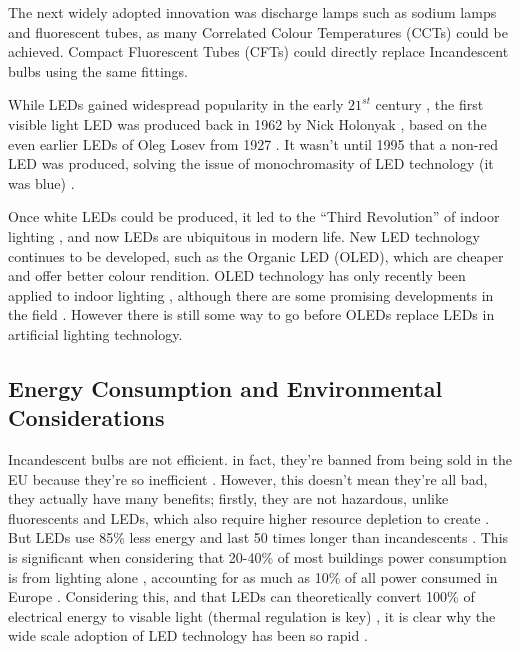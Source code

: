 The next widely adopted innovation was discharge lamps such as sodium lamps and fluorescent tubes, as many Correlated Colour Temperatures (CCTs) could be achieved. Compact Fluorescent Tubes (CFTs) could directly replace Incandescent bulbs using the same fittings.

While LEDs gained widespread popularity in the early $21^{st}$ century \citep{matsumotoMeasuringHouseholdAbility2020}, the first visible light LED was produced back in 1962 by Nick Holonyak \citep{holonyakCOHERENTVISIBLELIGHT1962}, based on the even earlier LEDs of Oleg Losev from 1927 \citep{zheludevLifeTimesLED2007}. It wasn't until 1995 that a non-red LED was produced, solving the issue of monochromasity of LED technology (it was blue) \citep{nakamuraInGaNAlGaNBlue1995}.

Once white LEDs could be produced, it led to the ``Third Revolution'' of indoor lighting \citep{montoyaIndoorLightingTechniques2017a}, and now LEDs are ubiquitous in modern life. New LED technology continues to be developed, such as the Organic LED (OLED), which are cheaper and offer better colour rendition. OLED technology has only recently been applied to indoor lighting \citep{phelanOLEDLightingHits2018}, although there are some promising developments in the field \citep{benderSolidStateLightingConcise2015}. However there is still some way to go before OLEDs replace LEDs in artificial lighting technology.

\subsection{Energy Consumption and Environmental Considerations}
\label{sec:Energy}

Incandescent bulbs are not efficient. in fact, they're banned from being sold in the EU because they're so inefficient \citep{euDirective2012272012}. However, this doesn't mean they're all bad, they actually have many benefits; firstly, they are not hazardous, unlike fluorescents and LEDs, which also require higher resource depletion to create \citep{limPotentialEnvironmentalImpacts2013}. But LEDs use 85\% less energy and last 50 times longer than incandescents \citep{mottierLEDLightingApplications2010}. This is significant when considering that 20-40\% of most buildings power consumption is from lighting alone \citep{perez-lombardReviewBuildingsEnergy2008}, accounting for as much as 10\% of all power consumed in Europe \citep{bertoldiEnergyEfficiencyStatus2012}. Considering  this, and that LEDs can theoretically convert 100\% of electrical energy to visable light (thermal regulation is key) \citep{jordanChallengesLEDPackaging2012}, it is clear why the wide scale adoption of LED technology has been so rapid \citep{matsumotoMeasuringHouseholdAbility2020}.



